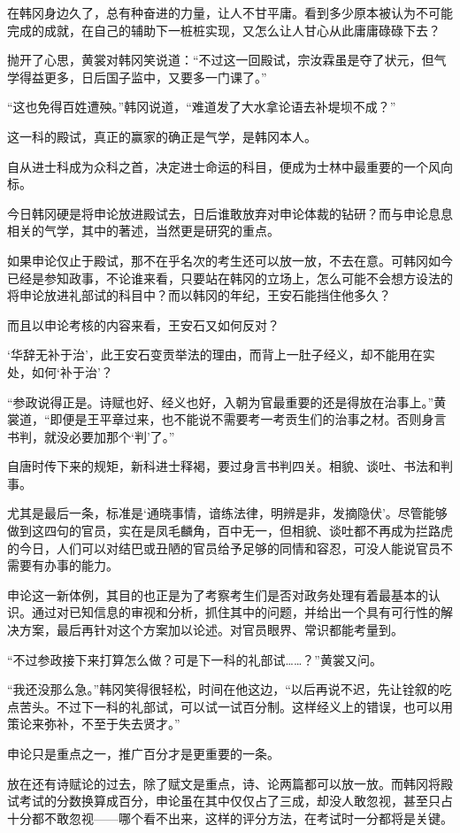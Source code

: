 在韩冈身边久了，总有种奋进的力量，让人不甘平庸。看到多少原本被认为不可能完成的成就，在自己的辅助下一桩桩实现，又怎么让人甘心从此庸庸碌碌下去？

抛开了心思，黄裳对韩冈笑说道：“不过这一回殿试，宗汝霖虽是夺了状元，但气学得益更多，日后国子监中，又要多一门课了。”

“这也免得百姓遭殃。”韩冈说道，“难道发了大水拿论语去补堤坝不成？”

这一科的殿试，真正的赢家的确正是气学，是韩冈本人。

自从进士科成为众科之首，决定进士命运的科目，便成为士林中最重要的一个风向标。

今日韩冈硬是将申论放进殿试去，日后谁敢放弃对申论体裁的钻研？而与申论息息相关的气学，其中的著述，当然更是研究的重点。

如果申论仅止于殿试，那不在乎名次的考生还可以放一放，不去在意。可韩冈如今已经是参知政事，不论谁来看，只要站在韩冈的立场上，怎么可能不会想方设法的将申论放进礼部试的科目中？而以韩冈的年纪，王安石能挡住他多久？

而且以申论考核的内容来看，王安石又如何反对？

‘华辞无补于治’，此王安石变贡举法的理由，而背上一肚子经义，却不能用在实处，如何‘补于治’？

“参政说得正是。诗赋也好、经义也好，入朝为官最重要的还是得放在治事上。”黄裳道，“即便是王平章过来，也不能说不需要考一考贡生们的治事之材。否则身言书判，就没必要加那个‘判’了。”

自唐时传下来的规矩，新科进士释褐，要过身言书判四关。相貌、谈吐、书法和判事。

尤其是最后一条，标准是‘通晓事情，谙练法律，明辨是非，发摘隐伏’。尽管能够做到这四句的官员，实在是凤毛麟角，百中无一，但相貌、谈吐都不再成为拦路虎的今日，人们可以对结巴或丑陋的官员给予足够的同情和容忍，可没人能说官员不需要有办事的能力。

申论这一新体例，其目的也正是为了考察考生们是否对政务处理有着最基本的认识。通过对已知信息的审视和分析，抓住其中的问题，并给出一个具有可行性的解决方案，最后再针对这个方案加以论述。对官员眼界、常识都能考量到。

“不过参政接下来打算怎么做？可是下一科的礼部试……？”黄裳又问。

“我还没那么急。”韩冈笑得很轻松，时间在他这边，“以后再说不迟，先让铨叙的吃点苦头。不过下一科的礼部试，可以试一试百分制。这样经义上的错误，也可以用策论来弥补，不至于失去贤才。”

申论只是重点之一，推广百分才是更重要的一条。

放在还有诗赋论的过去，除了赋文是重点，诗、论两篇都可以放一放。而韩冈将殿试考试的分数换算成百分，申论虽在其中仅仅占了三成，却没人敢忽视，甚至只占十分都不敢忽视——哪个看不出来，这样的评分方法，在考试时一分都将是关键。

